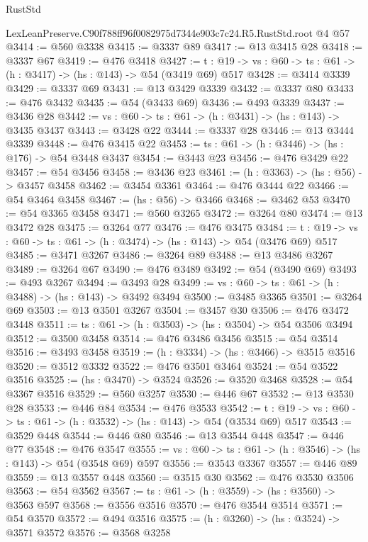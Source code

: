 \begin{lexlean}{RustStd}
\begin{coremodule}
  LexLeanPreserve.C90f788ff96f0082975d7344e903c7c24.R5.RustStd.root @4 @57
@3414 := @560 @3338
@3415 := @3337 @89
@3417 := @13 @3415 @28
@3418 := @3337 @67
@3419 := @476 @3418
@3427 := {t : @19} -> {vs : @60} -> {ts : @61} -> (h : @3417) -> (hs : @143) -> @54 (@3419 @69) @517
@3428 := @3414 @3339
@3429 := @3337 @69
@3431 := @13 @3429 @3339
@3432 := @3337 @80
@3433 := @476 @3432
@3435 := @54 (@3433 @69)
@3436 := @493 @3339
@3437 := @3436 @28
@3442 := {vs : @60} -> {ts : @61} -> (h : @3431) -> (hs : @143) -> @3435 @3437
@3443 := @3428 @22
@3444 := @3337 @28
@3446 := @13 @3444 @3339
@3448 := @476 @3415 @22
@3453 := {ts : @61} -> (h : @3446) -> (hs : @176) -> @54 @3448 @3437
@3454 := @3443 @23
@3456 := @476 @3429 @22
@3457 := @54 @3456
@3458 := @3436 @23
@3461 := (h : @3363) -> (hs : @56) -> @3457 @3458
@3462 := @3454 @3361
@3464 := @476 @3444 @22
@3466 := @54 @3464 @3458
@3467 := (hs : @56) -> @3466
@3468 := @3462 @53
@3470 := @54 @3365 @3458
@3471 := @560 @3265
@3472 := @3264 @80
@3474 := @13 @3472 @28
@3475 := @3264 @77
@3476 := @476 @3475
@3484 := {t : @19} -> {vs : @60} -> {ts : @61} -> (h : @3474) -> (hs : @143) -> @54 (@3476 @69) @517
@3485 := @3471 @3267
@3486 := @3264 @89
@3488 := @13 @3486 @3267
@3489 := @3264 @67
@3490 := @476 @3489
@3492 := @54 (@3490 @69)
@3493 := @493 @3267
@3494 := @3493 @28
@3499 := {vs : @60} -> {ts : @61} -> (h : @3488) -> (hs : @143) -> @3492 @3494
@3500 := @3485 @3365
@3501 := @3264 @69
@3503 := @13 @3501 @3267
@3504 := @3457 @30
@3506 := @476 @3472 @3448
@3511 := {ts : @61} -> (h : @3503) -> (hs : @3504) -> @54 @3506 @3494
@3512 := @3500 @3458
@3514 := @476 @3486 @3456
@3515 := @54 @3514
@3516 := @3493 @3458
@3519 := (h : @3334) -> (hs : @3466) -> @3515 @3516
@3520 := @3512 @3332
@3522 := @476 @3501 @3464
@3524 := @54 @3522 @3516
@3525 := (hs : @3470) -> @3524
@3526 := @3520 @3468
@3528 := @54 @3367 @3516
@3529 := @560 @3257
@3530 := @446 @67
@3532 := @13 @3530 @28
@3533 := @446 @84
@3534 := @476 @3533
@3542 := {t : @19} -> {vs : @60} -> {ts : @61} -> (h : @3532) -> (hs : @143) -> @54 (@3534 @69) @517
@3543 := @3529 @448
@3544 := @446 @80
@3546 := @13 @3544 @448
@3547 := @446 @77
@3548 := @476 @3547
@3555 := {vs : @60} -> {ts : @61} -> (h : @3546) -> (hs : @143) -> @54 (@3548 @69) @597
@3556 := @3543 @3367
@3557 := @446 @89
@3559 := @13 @3557 @448
@3560 := @3515 @30
@3562 := @476 @3530 @3506
@3563 := @54 @3562
@3567 := {ts : @61} -> (h : @3559) -> (hs : @3560) -> @3563 @597
@3568 := @3556 @3516
@3570 := @476 @3544 @3514
@3571 := @54 @3570
@3572 := @494 @3516
@3575 := (h : @3260) -> (hs : @3524) -> @3571 @3572
@3576 := @3568 @3258

\end{coremodule}
\end{lexlean}
